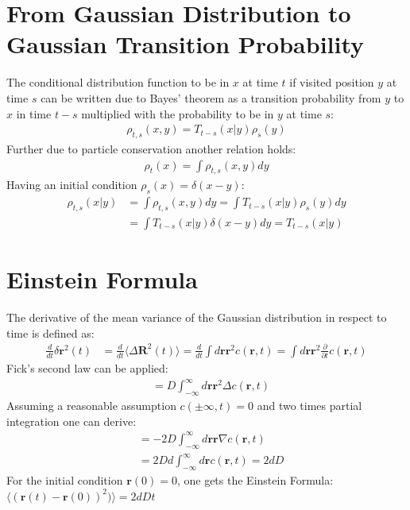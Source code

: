 \documentclass[
  a4paper,BCOR10mm,oneside,
  bibtotoc,idxtotoc,
  headsepline,footsepline,%
  fleqn,openbib
]{scrbook}
\begin{document}
\section{From Gaussian Distribution to Gaussian Transition Probability}\label{baystheorem}
The conditional distribution function to be in $x$ at time $t$ if visited position $y$ at time $s$   can be written due to Bayes' theorem as a transition probability from $y$ to $x$ in time $t-s$ multiplied with the probability to be in $y$ at time $s$:
\begin{align}
 \rho_{t,s}(x,y)=T_{t-s}(x|y) \rho_s(y)
\end{align}
Further due to particle conservation another relation holds:
\begin{align}
 \rho_{t}(x)= \int \rho_{t,s}(x,y) dy
\end{align}
Having an initial condition $\rho_{s}(x)= \delta(x-y)$:
\begin{align}
 \rho_{t,s}(x|y)&= \int \rho_{t,s}(x,y) dy = \int T_{t-s}(x|y) \rho_s(y) dy\\
 &= \int T_{t-s}(x|y) \delta(x-y) dy 
 = T_{t-s}(x|y)
\end{align}
\section{Einstein Formula} \label{einsteinrealtionappendix}
The derivative of the mean variance of the Gaussian distribution in respect to time is defined as:
\begin{align}
 \frac{d}{dt}  \delta \bm{r}^2(t)&=\frac{d}{dt} \langle \Delta \bm{ R}^2(t)\rangle  =\frac{d}{dt} \int d\bm{r} \bm{r}^2 c(\bm{r},t)=\int d\bm{r} \bm{r}^2 \frac{\partial}{\partial t} c(\bm{r},t) 
\end{align}
Fick's second law can be applied:
\begin{align}
&= D \int_{-\infty}^{\infty}d\bm{r} \bm{r}^2 \Delta c(\bm{r},t)  
\end{align}
Assuming a reasonable assumption  $c(\pm \infty,t)=0$  and two times partial integration one can derive:
\begin{align}
&= -2 D \int_{-\infty}^{\infty} d\bm{r} \bm{r} \nabla c(\bm{r},t) \\ &= 2 D d \int_{-\infty}^{\infty} d\bm{r} c(\bm{r},t) =2dD
\end{align}
For the initial condition $\bm{r}(0) = 0$,  one gets the Einstein Formula: $\langle (\bm{r}(t)-\bm{r}(0))^2)\rangle= 2dDt$

\end{document}
